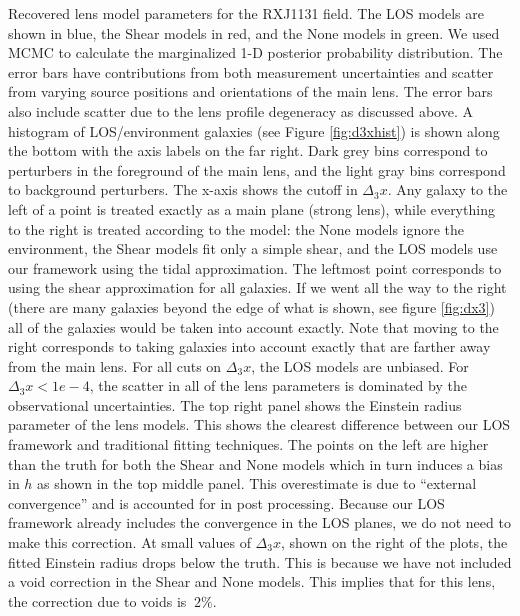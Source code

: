\label{fig:RXJ1131} Recovered lens model parameters for the RXJ1131 field. The LOS models are shown in blue, the Shear models in red, and the None models in green. We used MCMC to calculate the marginalized 1-D posterior probability distribution. The error bars have contributions from both measurement uncertainties and scatter from varying source positions and orientations of the main lens. The error bars also include scatter due to the lens profile degeneracy as discussed above. A histogram of LOS/environment galaxies (see Figure \ref{fig:d3xhist}) is shown along the bottom with the axis labels on the far right. Dark grey bins correspond to perturbers in the foreground of the main lens, and the light gray bins correspond to background perturbers. The x-axis shows the cutoff in $\Delta_3 x$. Any galaxy to the left of a point is treated exactly as a main plane (strong lens), while everything to the right is treated according to the model: the None models ignore the environment, the Shear models fit only a simple shear, and the LOS models use our framework using the tidal approximation. The leftmost point corresponds to using the shear approximation for all galaxies. If we went all the way to the right (there are many galaxies beyond the edge of what is shown, see figure \ref{fig:dx3}) all of the galaxies would be taken into account exactly. Note that moving to the right corresponds to taking galaxies into account exactly that are farther away from the main lens. For all cuts on $\Delta_3 x$, the LOS models are unbiased. For $\Delta_3 x < 1e-4$, the scatter in all of the lens parameters is dominated by the observational uncertainties. The top right panel shows the Einstein radius parameter of the lens models. This shows the clearest difference between our LOS framework and traditional fitting techniques. The points on the left are higher than the truth for both the Shear and None models which in turn induces a bias in $h$ as shown in the top middle panel. This overestimate is due to ``external convergence'' and is accounted for in post processing. Because our LOS framework already includes the convergence in the LOS planes, we do not need to make this correction. At small values of $\Delta_3 x$, shown on the right of the plots, the fitted Einstein radius drops below the truth. This is because we have not included a void correction in the Shear and None models. This implies that for this lens, the correction due to voids is $~2\%$.